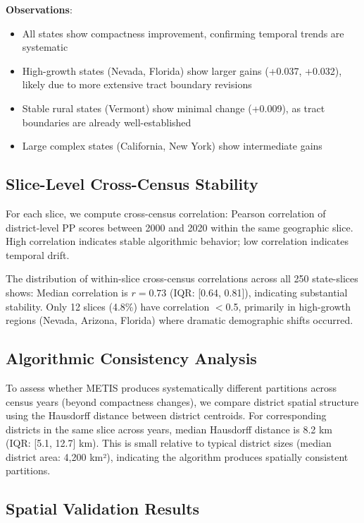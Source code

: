 \textbf{Observations}:
\begin{itemize}
    \item All states show compactness improvement, confirming temporal trends are systematic
    \item High-growth states (Nevada, Florida) show larger gains (+0.037, +0.032), likely due to more extensive tract boundary revisions
    \item Stable rural states (Vermont) show minimal change (+0.009), as tract boundaries are already well-established
    \item Large complex states (California, New York) show intermediate gains
\end{itemize}

\subsection{Slice-Level Cross-Census Stability}

For each slice, we compute cross-census correlation: Pearson correlation of district-level PP scores between 2000 and 2020 within the same geographic slice. High correlation indicates stable algorithmic behavior; low correlation indicates temporal drift.

The distribution of within-slice cross-census correlations across all 250 state-slices shows: Median correlation is $r=0.73$ (IQR: [0.64, 0.81]), indicating substantial stability. Only 12 slices (4.8\%) have correlation $<$0.5, primarily in high-growth regions (Nevada, Arizona, Florida) where dramatic demographic shifts occurred.

\subsection{Algorithmic Consistency Analysis}

To assess whether METIS produces systematically different partitions across census years (beyond compactness changes), we compare district spatial structure using the Hausdorff distance between district centroids. For corresponding districts in the same slice across years, median Hausdorff distance is 8.2 km (IQR: [5.1, 12.7] km). This is small relative to typical district sizes (median district area: 4,200 km²), indicating the algorithm produces spatially consistent partitions.

\subsection{Spatial Validation Results}
\label{sec:spatial-validation-results}

